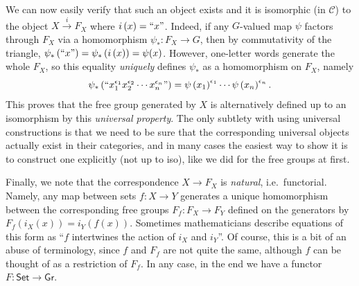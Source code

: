 \documentclass[english,letterpaper]{article}%
\numberwithin{equation}{section}
\numberwithin{figure}{section}
\numberwithin{table}{section}
\theoremstyle{definition}
\theoremstyle{definition}
\theoremstyle{definition}
\theoremstyle{plain}
\theoremstyle{plain}
\theoremstyle{plain}
\theoremstyle{plain}
\theoremstyle{remark}
\theoremstyle{remark}
\begin{document}
\begin{example}
We can now easily verify that such an object exists and it is isomorphic
(in $\mathcal{C}$) to the object $X\overset{i}{\to}F_{X}$ where
$i\left(x\right)=``x"$. Indeed, if any $G$-valued map $\psi$ factors
through $F_{X}$ via a homomorphism $\psi_{\ast}:F_{X}\to G$, then
by commutativity of the triangle, $\psi_{\ast}\left(``x"\right)=\psi_{\ast}\left(i\left(x\right)\right)=\psi(x)$.
However, one-letter words generate the whole $F_{X}$, so this equality
\emph{uniquely} defines $\psi_{\ast}$ as a homomorphism on $F_{X}$,
namely
\begin{equation}
\psi_{\ast}\left(``x_{1}^{\epsilon_{1}}x_{2}^{\epsilon_{2}}\cdots x_{n}^{\epsilon_{n}}"\right)=\psi\left(x_{1}\right)^{\epsilon_{1}}\cdots\psi\left(x_{n}\right)^{\epsilon_{n}}.
\end{equation}
This proves that the free group generated by $X$ is alternatively
defined up to an isomorphism by this \emph{universal property}.
The only subtlety with using universal constructions is that we need
to be sure that the corresponding universal objects actually exist
in their categories, and in many cases the easiest way to show it
is to construct one explicitly (not up to iso), like we did for the
free groups at first.

Finally, we note that the correspondence $X\to F_X$ is \emph{natural}, i.e.\ functorial. Namely, any map between sets $f:X\to Y$ generates a unique homomorphism between the corresponding free groups $F_f:F_X\to F_Y$ defined on the generators by $F_f (i_X(x))=i_Y(f(x))$. Sometimes mathematicians describe equations of this form as ``$f$ intertwines the action of $i_X$ and $i_Y$''. Of course, this is a bit of an abuse of terminology, since $f$ and $F_f$ are not quite the same, although $f$ can be thought of as a restriction of $F_f$. In any case, in the end we have a functor $F:\mathsf{Set}\to\mathsf{Gr}$.

\end{example}
\end{document}
